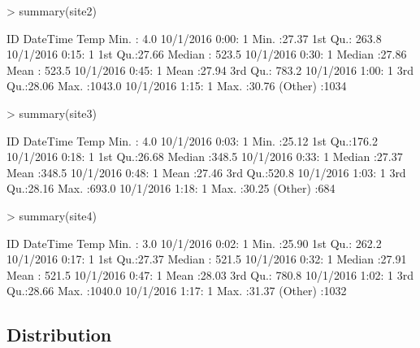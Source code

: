 \documentclass{article}
\begin{document}
\begin{Schunk}
\begin{Sinput}
> summary(site2)
\end{Sinput}
\begin{Soutput}
       ID                   DateTime         Temp      
 Min.   :   4.0   10/1/2016 0:00:   1   Min.   :27.37  
 1st Qu.: 263.8   10/1/2016 0:15:   1   1st Qu.:27.66  
 Median : 523.5   10/1/2016 0:30:   1   Median :27.86  
 Mean   : 523.5   10/1/2016 0:45:   1   Mean   :27.94  
 3rd Qu.: 783.2   10/1/2016 1:00:   1   3rd Qu.:28.06  
 Max.   :1043.0   10/1/2016 1:15:   1   Max.   :30.76  
                  (Other)       :1034                  
\end{Soutput}
\end{Schunk}

\begin{Schunk}
\begin{Sinput}
> summary(site3)
\end{Sinput}
\begin{Soutput}
       ID                  DateTime        Temp      
 Min.   :  4.0   10/1/2016 0:03:  1   Min.   :25.12  
 1st Qu.:176.2   10/1/2016 0:18:  1   1st Qu.:26.68  
 Median :348.5   10/1/2016 0:33:  1   Median :27.37  
 Mean   :348.5   10/1/2016 0:48:  1   Mean   :27.46  
 3rd Qu.:520.8   10/1/2016 1:03:  1   3rd Qu.:28.16  
 Max.   :693.0   10/1/2016 1:18:  1   Max.   :30.25  
                 (Other)       :684                  
\end{Soutput}
\end{Schunk}

\begin{Schunk}
\begin{Sinput}
> summary(site4)
\end{Sinput}
\begin{Soutput}
       ID                   DateTime         Temp      
 Min.   :   3.0   10/1/2016 0:02:   1   Min.   :25.90  
 1st Qu.: 262.2   10/1/2016 0:17:   1   1st Qu.:27.37  
 Median : 521.5   10/1/2016 0:32:   1   Median :27.91  
 Mean   : 521.5   10/1/2016 0:47:   1   Mean   :28.03  
 3rd Qu.: 780.8   10/1/2016 1:02:   1   3rd Qu.:28.66  
 Max.   :1040.0   10/1/2016 1:17:   1   Max.   :31.37  
                  (Other)       :1032                  
\end{Soutput}
\end{Schunk}

\subsection{Distribution}
\end{document}

